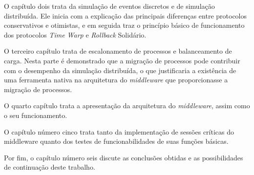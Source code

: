 O capítulo dois trata da simulação de eventos discretos e de simulação distribuída. Ele inicia com a explicação das principais diferenças entre protocolos conservativos e otimistas, e em seguida traz o princípio básico de funcionamento dos protocolos \textit{Time Warp} e \textit{Rollback} Solidário.

O terceiro capítulo trata de escalonamento de processos e balanceamento de carga. Nesta parte é demonstrado que a migração de processos pode contribuir com o desempenho da simulação distribuída, o que justificaria a existência de uma ferramenta nativa na arquitetura do \textit{middleware} que proporcionasse a migração de processos.

O quarto capítulo trata a apresentação da arquitetura do \textit{middleware}, assim como o seu funcionamento.

O capítulo número cinco trata tanto da implementação de sessões críticas do middleware quanto dos testes de funcionabilidades de suas funções básicas.

Por fim, o capítulo número seis discute as conclusões obtidas e as possibilidades de continuação deste trabalho.